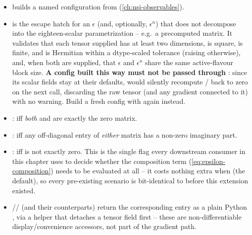 \begin{implbox}[title={Preset construction and the raw-epsilon escape hatch}]
\begin{itemize}
  \item {} builds a named configuration
    from  (\cref{ch:nsi-observables}).
  \item {} is
    the escape hatch for an $\epsilon$ (and, optionally, $\epsilon^n$) that
    does not decompose into the eighteen-scalar parametrization -- e.g.\ a
    precomputed matrix. It validates that each tensor supplied has at least
    two dimensions, is square, is finite, and is Hermitian within a
    dtype-scaled tolerance (raising  otherwise), and, when
    both are supplied, that $\epsilon$ and $\epsilon^n$ share the same
    active-flavour block size. \textbf{A config built this way must not be
    passed through }: since its scalar fields
    stay at their  defaults,  would
    silently recompute / back to zero on the
    next  call, discarding the raw tensor (and any
    gradient connected to it) with no warning. Build a fresh config with
     again instead.
\end{itemize}
\end{implbox}

\begin{implbox}[title={Convenience properties}]
\begin{itemize}
  \item {}:  iff \emph{both} 
    and  are exactly the zero matrix.
  \item {}:  iff any off-diagonal entry
    of \emph{either} matrix has a non-zero imaginary part.
  \item {}:  iff  is
    not exactly zero. This is the single flag every downstream consumer in
    this chapter uses to decide whether the composition term
    (\cref{eq:epsilon-composition}) needs to be evaluated at all -- it costs
    nothing extra when  (the default), so every pre-existing
    scenario is bit-identical to before this extension existed.
  \item {}// (and their
     counterparts) return the corresponding entry as a plain
    Python , via a helper that detaches a tensor field first
    -- these are non-differentiable display/convenience accessors, not part
    of the gradient path.
\end{itemize}
\end{implbox}

